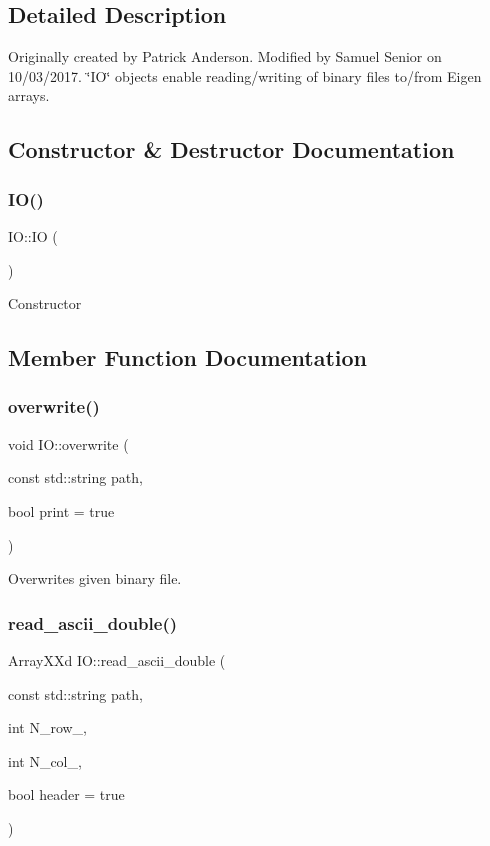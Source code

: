 \subsection{Detailed Description}
Originally created by Patrick Anderson. Modified by Samuel Senior on 10/03/2017. \char`\"{}\+I\+O\char`\"{} objects enable reading/writing of binary files to/from Eigen arrays. 

\subsection{Constructor \& Destructor Documentation}
\mbox{\label{class_i_o_a49b27a2ee79bce0de4e3ef163cbebd30}} 
\subsubsection{\texorpdfstring{IO()}{IO()}}
{\footnotesize\ttfamily I\+O\+::\+IO (\begin{DoxyParamCaption}{ }\end{DoxyParamCaption})}

Constructor 

\subsection{Member Function Documentation}
\mbox{\label{class_i_o_a0fd7211866348cd3acc26d1ed17c100c}} 
\subsubsection{\texorpdfstring{overwrite()}{overwrite()}}
{\footnotesize\ttfamily void I\+O\+::overwrite (\begin{DoxyParamCaption}\item[{const std\+::string}]{path,  }\item[{bool}]{print = {\ttfamily true} }\end{DoxyParamCaption})}

Overwrites given binary file.\mbox{\label{class_i_o_a3ddd4b5d95a8a5cfffb56cfcf7c186e1}} 
\subsubsection{\texorpdfstring{read\_ascii\_double()}{read\_ascii\_double()}}
{\footnotesize\ttfamily Array\+X\+Xd I\+O\+::read\+\_\+ascii\+\_\+double (\begin{DoxyParamCaption}\item[{const std\+::string}]{path,  }\item[{int}]{N\+\_\+row\+\_\+,  }\item[{int}]{N\+\_\+col\+\_\+,  }\item[{bool}]{header = {\ttfamily true} }\end{DoxyParamCaption})}

